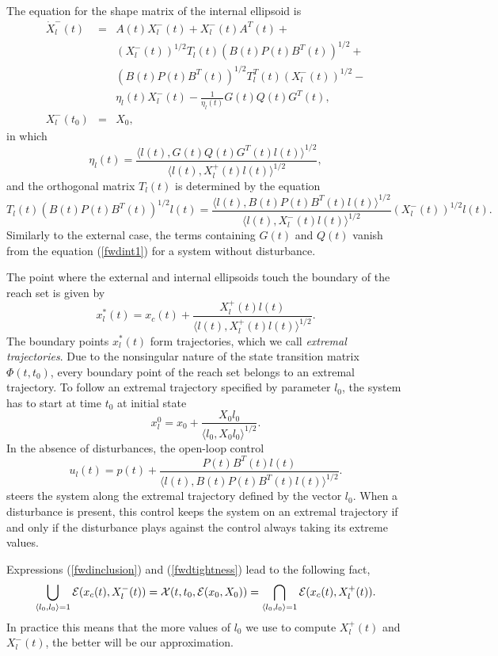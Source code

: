 The equation for the shape matrix of the internal ellipsoid is
\begin{eqnarray}
\dot{X}^-_l(t) & = & A(t)X^-_l(t) + X^-_l(t)A^T(t) +\nonumber \\
& & (X_l^{-}(t))^{1/2}T_l(t)(B(t)P(t)B^T(t))^{1/2} +\nonumber \\
& & (B(t)P(t)B^T(t))^{1/2}T_l^T(t)(X_l^{-}(t))^{1/2} -\nonumber \\
& & \eta_l(t)X^-_l(t) - \frac{1}{\eta_l(t)}G(t)Q(t)G^T(t), \label{fwdint1} \\
X^-_l(t_0) & = & X_0, \label{fwdint2}
\end{eqnarray}
in which
\[ \eta_l(t) = \frac{\langle l(t),
G(t)Q(t)G^T(t)l(t)\rangle^{1/2}}{\langle l(t), X^+_l(t)l(t)\rangle^{1/2}}, \]
and the orthogonal matrix $T_l(t)$ is determined by the equation
\[ T_l(t)(B(t)P(t)B^T(t))^{1/2}l(t) = \frac{\langle l(t),
B(t)P(t)B^T(t)l(t)\rangle^{1/2}}{\langle l(t),
X_l^-(t)l(t)\rangle^{1/2}}(X_l^{-}(t))^{1/2}l(t). \]
Similarly to the external case, the terms containing $G(t)$ and $Q(t)$
vanish from the equation (\ref{fwdint1}) for a system without disturbance.

The  point where the external and internal ellipsoids touch the
boundary of the reach set is given by
\[ x_l^*(t) = x_c(t) +
\frac{X^+_l(t)l(t)}{\langle l(t), X^+_l(t)l(t)\rangle^{1/2}} .\]
The boundary points $x^*_l(t)$ form trajectories, which we call
{\it extremal trajectories}.
Due to the nonsingular nature of the state transition matrix $\Phi(t,t_0)$,
every boundary point of the reach set belongs to an extremal trajectory.
To follow an extremal trajectory specified by parameter $l_0$, the
system has to start at time $t_0$ at initial state
\begin{equation}
x^0_l = x_0 + \frac{X_0l_0}{\langle l_0,X_0l_0\rangle^{1/2}}. \label{x0lct}
\end{equation}
In the absence of disturbances, the open-loop control
\begin{equation}
u_l(t) = p(t) + \frac{P(t)B^T(t)l(t)}{\langle l(t),
B(t)P(t)B^T(t)l(t)\rangle^{1/2}}. \label{uct}
\end{equation}
steers the system along the extremal trajectory defined by the vector $l_0$.
When a disturbance is present, this control keeps the system on an extremal
trajectory if and only if the disturbance plays against the control
always taking its extreme values.

Expressions (\ref{fwdinclusion}) and (\ref{fwdtightness}) lead
to the following fact,
\[ \bigcup_{\langle l_0,l_0\rangle=1}\EE(x_c(t),X^-_l(t)) =
\XX(t,t_0,\EE(x_0,X_0)) =
\bigcap_{\langle l_0,l_0\rangle=1}\EE(x_c(t),X^+_l(t)). \]
In practice this means that the more values of $l_0$
we use to compute $X^+_l(t)$ and
$X^-_l(t)$, the better will be our approximation.




